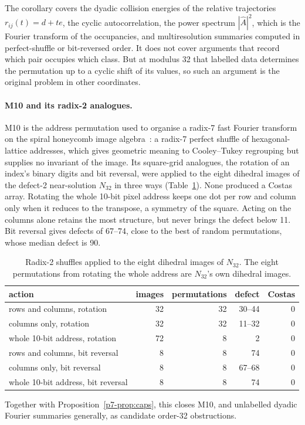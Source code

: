 The corollary covers the dyadic collision energies of the relative trajectories
$r_{ij}(t)=d+te$, the cyclic autocorrelation, the power spectrum $|\hat A|^2$, which is the Fourier
transform of the occupancies, and multiresolution summaries computed in perfect-shuffle or bit-reversed
order. It does not cover arguments that record which pair occupies which class. But at modulus 32 that
labelled data determines the permutation up to a cyclic shift of its values, so such an argument is the
original problem in other coordinates.

\paragraph{M10 and its radix-2 analogues.} M10 is the address permutation used to organise a radix-7
fast Fourier transform on the spiral honeycomb image algebra~\cite{p7-sheridan2005}: a radix-7 perfect
shuffle of hexagonal-lattice addresses, which gives geometric meaning to Cooley--Tukey regrouping but
supplies no invariant of the image. Its square-grid analogues, the rotation of an index's binary digits
and bit reversal, were applied to the eight dihedral images of the defect-2 near-solution $N_{32}$ in
three ways (Table~\ref{p7-tab:shuffle}). None produced a Costas array. Rotating the whole 10-bit pixel
address keeps one dot per row and column only when it reduces to the transpose, a symmetry of the
square. Acting on the columns alone retains the most structure, but never brings the defect below 11.
Bit reversal gives defects of 67--74, close to the best of random permutations, whose median defect is
90.

\begin{table}[H]
\centering
\small
\begin{tabular}{@{}lrrrr@{}}
\toprule
action & images & permutations & defect & Costas \\
\midrule
rows and columns, rotation & 32 & 32 & 30--44 & 0 \\
columns only, rotation & 32 & 32 & 11--32 & 0 \\
whole 10-bit address, rotation & 72 & 8 & 2 & 0 \\
rows and columns, bit reversal & 8 & 8 & 74 & 0 \\
columns only, bit reversal & 8 & 8 & 67--68 & 0 \\
whole 10-bit address, bit reversal & 8 & 8 & 74 & 0 \\
\bottomrule
\end{tabular}
\caption{Radix-2 shuffles applied to the eight dihedral images of $N_{32}$. The eight permutations from
rotating the whole address are $N_{32}$'s own dihedral images.}
\label{p7-tab:shuffle}
\end{table}

\noindent Together with Proposition~\ref{p7-prop:caps}, this closes M10, and unlabelled dyadic Fourier
summaries generally, as candidate order-32 obstructions.

